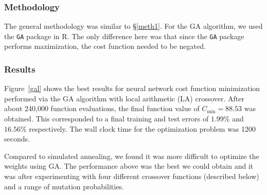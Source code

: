 \documentclass[10pt,letterpaper]{article}
\begin{document}
\subsubsection{Methodology}
The general methodology was similar to \S\ref{meth1}. For the GA algorithm, we used the {\tt GA} package in R. The only difference here was that since the {\tt GA} package performs maximization, the cost function needed to be negated. 
\subsubsection{Results}
Figure~\ref{gal} shows the best results for neural network cost function minimization performed via the GA algorithm with local arithmetic (LA) crossover. After about 240,000 function evaluations, the final function value of $C_{\text{min}}=88.53$ was obtained. This corresponded to a final training and test errors of $1.99\%$ and $16.56\%$ respectively. The wall clock time for the optimization problem was 1200 seconds. 

Compared to simulated annealing, we found it was more difficult to optimize the weights using GA. The performance above was the best we could obtain and it was after experimenting with four different crossover functions (described below) and a range of mutation probabilities. 
\end{document}
